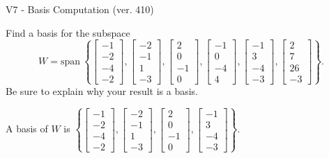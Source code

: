 \begin{exercise}
  \begin{exerciseTitle}V7 - Basis Computation (ver. 410)\end{exerciseTitle}
  \begin{exerciseStatement}
    Find a basis for the subspace 
\[W=\mathrm{span}\ \left\{\left[\begin{array}{r}
-1 \\
-2 \\
-4 \\
-2
\end{array}\right] , \left[\begin{array}{r}
-2 \\
-1 \\
1 \\
-3
\end{array}\right] , \left[\begin{array}{r}
2 \\
0 \\
-1 \\
0
\end{array}\right] , \left[\begin{array}{r}
-1 \\
0 \\
-4 \\
4
\end{array}\right] , \left[\begin{array}{r}
-1 \\
3 \\
-4 \\
-3
\end{array}\right] , \left[\begin{array}{r}
2 \\
7 \\
26 \\
-3
\end{array}\right]\right\}.\]
 Be sure to explain why your result is a basis.


  \end{exerciseStatement}
  \begin{exerciseAnswer}
   A basis of \(W\) is  \(\left\{\left[\begin{array}{r}
-1 \\
-2 \\
-4 \\
-2
\end{array}\right] , \left[\begin{array}{r}
-2 \\
-1 \\
1 \\
-3
\end{array}\right] , \left[\begin{array}{r}
2 \\
0 \\
-1 \\
0
\end{array}\right] , \left[\begin{array}{r}
-1 \\
3 \\
-4 \\
-3
\end{array}\right]\right\}\).
  


  \end{exerciseAnswer}
\end{exercise}